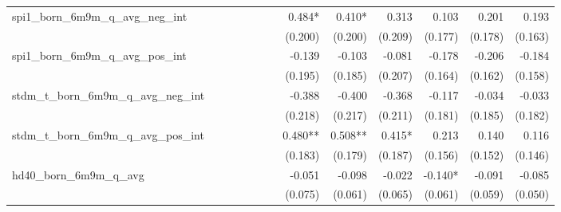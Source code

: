 \begin{tabular}{lrrrrrrrrrrrr}
spi1\_born\_6m9m\_q\_avg\_neg\_int          &              &              &              &              &              &              &       0.484* &       0.410* &        0.313 &        0.103 &        0.201 &        0.193 \\ 
                                            &              &              &              &              &              &              &      (0.200) &      (0.200) &      (0.209) &      (0.177) &      (0.178) &      (0.163) \\ 
spi1\_born\_6m9m\_q\_avg\_pos\_int          &              &              &              &              &              &              &       -0.139 &       -0.103 &       -0.081 &       -0.178 &       -0.206 &       -0.184 \\ 
                                            &              &              &              &              &              &              &      (0.195) &      (0.185) &      (0.207) &      (0.164) &      (0.162) &      (0.158) \\ 
stdm\_t\_born\_6m9m\_q\_avg\_neg\_int       &              &              &              &              &              &              &       -0.388 &       -0.400 &       -0.368 &       -0.117 &       -0.034 &       -0.033 \\ 
                                            &              &              &              &              &              &              &      (0.218) &      (0.217) &      (0.211) &      (0.181) &      (0.185) &      (0.182) \\ 
stdm\_t\_born\_6m9m\_q\_avg\_pos\_int       &              &              &              &              &              &              &      0.480** &      0.508** &       0.415* &        0.213 &        0.140 &        0.116 \\ 
                                            &              &              &              &              &              &              &      (0.183) &      (0.179) &      (0.187) &      (0.156) &      (0.152) &      (0.146) \\ 
hd40\_born\_6m9m\_q\_avg                    &              &              &              &              &              &              &       -0.051 &       -0.098 &       -0.022 &      -0.140* &       -0.091 &       -0.085 \\ 
                                            &              &              &              &              &              &              &      (0.075) &      (0.061) &      (0.065) &      (0.061) &      (0.059) &      (0.050) \\ 

\end{tabular}
